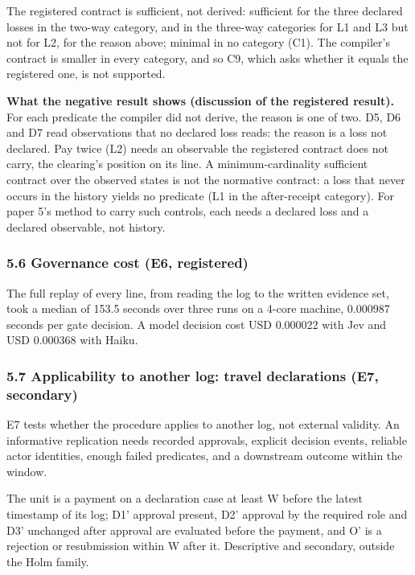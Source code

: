 \documentclass[
  10pt,
]{article}
\begin{document}
The registered contract is sufficient, not derived: sufficient for the
three declared losses in the two-way category, and in the three-way
categories for L1 and L3 but not for L2, for the reason above; minimal
in no category (C1). The compiler's contract is smaller in every
category, and so C9, which asks whether it equals the registered one, is
not supported.

\textbf{What the negative result shows (discussion of the registered
result).} For each predicate the compiler did not derive, the reason is
one of two. D5, D6 and D7 read observations that no declared loss reads:
the reason is a loss not declared. Pay twice (L2) needs an observable
the registered contract does not carry, the clearing's position on its
line. A minimum-cardinality sufficient contract over the observed states
is not the normative contract: a loss that never occurs in the history
yields no predicate (L1 in the after-receipt category). For paper 5's
method to carry such controls, each needs a declared loss and a declared
observable, not history.

\hypertarget{governance-cost-e6-registered}{%
\subsubsection{5.6 Governance cost (E6,
registered)}\label{governance-cost-e6-registered}}

The full replay of every line, from reading the log to the written
evidence set, took a median of 153.5 seconds over three runs on a 4-core
machine, 0.000987 seconds per gate decision. A model decision cost USD
0.000022 with Jev and USD 0.000368 with Haiku.

\hypertarget{applicability-to-another-log-travel-declarations-e7-secondary}{%
\subsubsection{5.7 Applicability to another log: travel declarations
(E7,
secondary)}\label{applicability-to-another-log-travel-declarations-e7-secondary}}

E7 tests whether the procedure applies to another log, not external
validity. An informative replication needs recorded approvals, explicit
decision events, reliable actor identities, enough failed predicates,
and a downstream outcome within the window.

The unit is a payment on a declaration case at least W before the latest
timestamp of its log; D1' approval present, D2' approval by the required
role and D3' unchanged after approval are evaluated before the payment,
and O' is a rejection or resubmission within W after it. Descriptive and
secondary, outside the Holm family.
\end{document}
